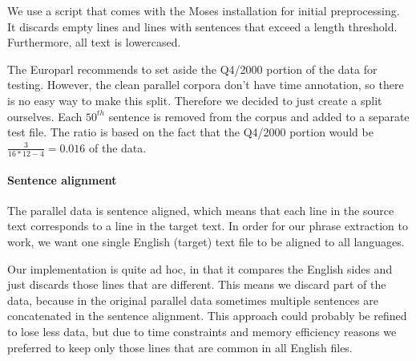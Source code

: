 \documentclass[11pt]{article}
\begin{document}
We use a script that comes with the Moses installation for initial preprocessing. It discards empty lines and lines with sentences that exceed a length threshold. Furthermore, all text is lowercased.

The Europarl recommends to set aside the Q4/2000 portion of the data for testing. However, the clean parallel corpora don't have time annotation, so there is no easy way to make this split. Therefore we decided to just create a split ourselves. Each $50^{th}$ sentence is removed from the corpus and added to a separate test file. The ratio is based on the fact that the Q4/2000 portion would be $\frac{3}{16*12-4}=0.016$ of the data.


\paragraph{Sentence alignment}
The parallel data is sentence aligned, which means that each line in the source text corresponds to a line in the target text.
In order for our phrase extraction to work, we want one single English (target) text file to be aligned to all languages.

Our implementation is quite ad hoc, in that it compares the English sides and just discards those lines that are different. This means we discard part of the data, because in the original parallel data sometimes multiple sentences are concatenated in the sentence alignment. This approach could probably be refined to lose less data, but due to time constraints and memory efficiency reasons we preferred to keep only those lines that are common in all English files. 
\end{document}
